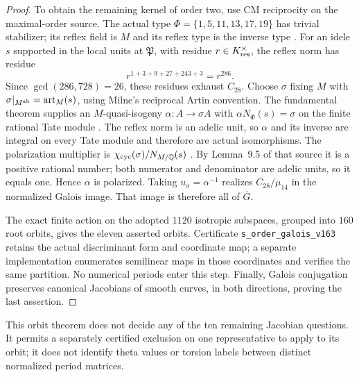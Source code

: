 \begin{proof}
To obtain the remaining kernel of order two, use CM reciprocity on
the maximal-order source. The actual type
$\Phi=\{1,5,11,13,17,19\}$ has trivial stabilizer; its reflex field
is $M$ and its reflex type is the inverse type
\cite[Example~1.19, Proposition~1.26]{MilneCM2020}.
For an idele $s$ supported in the local units at $\mathfrak P$,
with residue $r\in K_{\rm res}^\times$, the reflex norm has residue
\[
r^{1+3+9+27+243+3}=r^{286}.
\]
Since $\gcd(286,728)=26$, these residues exhaust $C_{28}$.
Choose $\sigma$ fixing $M$ with
$\sigma|_{M^{\rm ab}}=\operatorname{art}_M(s)$, using Milne's
reciprocal Artin convention.
The fundamental theorem supplies an $M$-quasi-isogeny
$\alpha:A\to\sigma A$ with $\alpha N_\Phi(s)=\sigma$ on the finite
rational Tate module \cite[Theorem~9.10]{MilneCM2020}.
The reflex norm is an adelic unit, so $\alpha$ and its inverse are
integral on every Tate module and therefore are actual isomorphisms.
The polarization multiplier is
$\chi_{\rm cyc}(\sigma)/N_{M/\mathbb Q}(s)$
\cite[Remark~9.11(c)]{MilneCM2020}. By Lemma~9.5 of that source it is
a positive rational number; both numerator and denominator are
adelic units, so it equals one. Hence $\alpha$ is polarized.
Taking $u_\sigma=\alpha^{-1}$ realizes $C_{28}/\mu_{14}$ in the
normalized Galois image. That image is therefore all of $\overline G$.

The exact finite action on the adopted $1120$ isotropic subspaces,
grouped into $160$ root orbits, gives the eleven asserted orbits.
Certificate \texttt{s\_order\_galois\_v163} retains the actual
discriminant form and coordinate map; a separate implementation enumerates semilinear maps in those
coordinates and verifies the same partition. No numerical periods
enter this step. Finally, Galois conjugation preserves canonical
Jacobians of smooth curves, in both directions, proving the last
assertion.
\end{proof}

This orbit theorem does not decide any of the ten remaining Jacobian
questions. It permits a separately certified exclusion on one
representative to apply to its orbit; it does not identify theta values
or torsion labels between distinct normalized period matrices.



